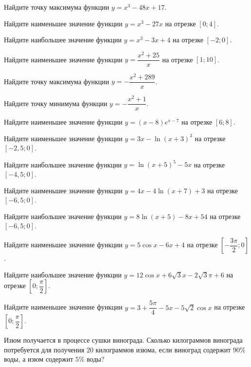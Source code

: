 
\begin{class}[number=1]
	\begin{listofex}
		\item Найдите точку максимума функции \(y=x^3-48x+17\).
		\item Найдите наименьшее значение функции \(y=x^3-27x\) на отрезке \([0;4]\).
		\item Найдите наибольшее значение функции \(y=x^3-3x+4\) на отрезке \([-2;0]\).
		\item Найдите наименьшее значение функции \(y=\dfrac{ x^2+25 }{ x }\) на отрезке \([1;10]\).
		\item Найдите точку максимума функции \(y=-\dfrac{ x^2+289 }{ x }\).
		\item Найдите точку минимума функции \(y=-\dfrac{ x^2+1 }{ x }\).
		\item Найдите наименьшее значение функции \(y=(x-8)e^{x-7}\) на отрезке \([6;8]\).
		\item Найдите наименьшее значение функции \(y=3x-\ln (x+3)^3\) на отрезке \([-2,5;0]\).
		\item Найдите наибольшее значение функции \(y=\ln (x+5)^5-5x\) на отрезке \([-4,5;0]\).
		\item Найдите наименьшее значение функции \(y=4x-4\ln (x+7)+3\) на отрезке \([-6,5;0]\).
		\item Найдите наибольшее значение функции \(y=8\ln (x+5)-8x+54\) на отрезке \([-6,5;0]\).
		\item Найдите наименьшее значение функции \(y=5 \cos x - 6x + 4 \) на отрезке \( \left[ -\dfrac{ 3\pi }{ 2 }; 0 \right] \).
		\item Найдите наибольшее значение функции \(y=12\cos x + 6\sqrt{3}x - 2 \sqrt{3} \pi +6 \) на отрезке \( \left[ 0; \dfrac{ \pi }{ 2 } \right] \).
		\item Найдите наименьшее значение функции \(y=3+\dfrac{ 5\pi }{ 4 } -5x - 5\sqrt{2} \cos x \) на отрезке \( \left[ 0; \dfrac{ \pi }{ 2 } \right] \).
		
		\item Изюм получается в процессе сушки винограда. Сколько килограммов винограда потребуется для получения \(20\) килограммов изюма, если виноград содержит \(90\%\) воды, а изюм содержит \(5\%\) воды?
		

\end{listofex}
\end{class}
